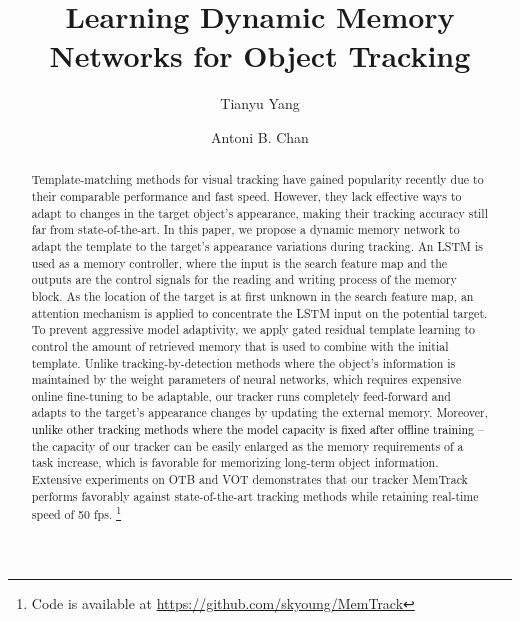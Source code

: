 \documentclass[runningheads]{llncs}
\newcommand{\tyy}[1]{\textcolor{black}{#1}}
\begin{document}
%
\title{Learning Dynamic Memory Networks for Object Tracking} 

%
\author{Tianyu Yang \and Antoni B. Chan}
%
%

%
\maketitle              %
%
\begin{abstract}
	Template-matching methods for visual tracking have gained popularity recently due to their comparable performance and fast speed. However, they lack effective ways to adapt to changes in the target object's appearance, making their tracking accuracy still far from state-of-the-art. In this paper, we propose a dynamic memory network to adapt the template to the target's appearance variations during tracking. An LSTM is used as a memory controller, where the input is the search feature map and the outputs are the control signals for the reading and writing process of the memory block. As the location of the target is at first unknown in the search feature map, an attention mechanism is applied to concentrate the LSTM input on the potential target. To prevent aggressive model adaptivity, we apply gated residual template learning to control the amount of retrieved memory that is used to combine with the initial template. Unlike tracking-by-detection methods where the object's information is maintained by the weight parameters of neural networks, which requires expensive online fine-tuning to be adaptable, our tracker runs completely feed-forward and adapts to the target's appearance changes by updating the external memory. Moreover, \tyy{unlike other tracking methods where the model capacity is fixed after offline training} -- the capacity of our tracker can be easily enlarged as the memory requirements of a task increase, which is favorable for memorizing long-term object information. Extensive experiments on OTB and VOT demonstrates that our tracker MemTrack performs favorably against state-of-the-art tracking methods while retaining real-time speed of 50 fps. \footnote{Code is available at \url{https://github.com/skyoung/MemTrack}}
	
\end{abstract}
\end{document}
